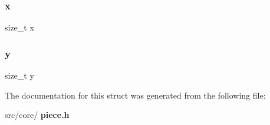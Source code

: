 \mbox{\label{structpiece_a63696707d410cb7773755276a4060273}} 
\subsubsection{x}
{\footnotesize\ttfamily size\+\_\+t x}

\mbox{\label{structpiece_a17ba7a9a912e4c6297861217711fd87e}} 
\subsubsection{y}
{\footnotesize\ttfamily size\+\_\+t y}



The documentation for this struct was generated from the following file\+:\begin{DoxyCompactItemize}
\item 
src/core/\textbf{ piece.\+h}\end{DoxyCompactItemize}
